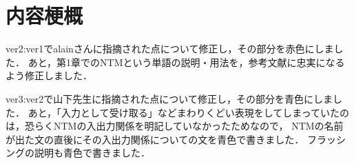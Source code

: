 \chapter*{内容梗概}
ver2:ver1でalainさんに指摘された点について修正し，その部分を赤色にしました．
あと，第1章でのNTMという単語の説明・用法を，参考文献に忠実になるよう修正しました．

ver3:ver2で山下先生に指摘された点について修正し，その部分を青色にしました．
あと，「入力として受け取る」などまわりくどい表現をしてしまっていたのは，恐らくNTMの入出力関係を明記していなかったためなので，
NTMの名前が出た文の直後にその入出力関係についての文を青色で書きました．
フラッシングの説明も青色で書きました．

